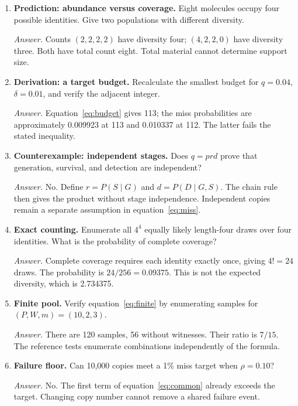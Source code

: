 \begin{enumerate}
\item \textbf{Prediction: abundance versus coverage.} Eight molecules occupy four possible identities. Give two populations with different diversity.\par
\textit{Answer.} Counts $(2,2,2,2)$ have diversity four; $(4,2,2,0)$ have diversity three. Both have total count eight. Total material cannot determine support size.

\item \textbf{Derivation: a target budget.} Recalculate the smallest budget for $q=0.04$, $\delta=0.01$, and verify the adjacent integer.\par
\textit{Answer.} Equation~\ref{eq:budget} gives 113; the miss probabilities are approximately 0.009923 at 113 and 0.010337 at 112. The latter fails the stated inequality.

\item \textbf{Counterexample: independent stages.} Does $q=prd$ prove that generation, survival, and detection are independent?\par
\textit{Answer.} No. Define $r=P(S\mid G)$ and $d=P(D\mid G,S)$. The chain rule then gives the product without stage independence. Independent copies remain a separate assumption in equation~\ref{eq:miss}.

\item \textbf{Exact counting.} Enumerate all $4^4$ equally likely length-four draws over four identities. What is the probability of complete coverage?\par
\textit{Answer.} Complete coverage requires each identity exactly once, giving $4!=24$ draws. The probability is $24/256=0.09375$. This is not the expected diversity, which is 2.734375.

\item \textbf{Finite pool.} Verify equation~\ref{eq:finite} by enumerating samples for $(P,W,m)=(10,2,3)$.\par
\textit{Answer.} There are 120 samples, 56 without witnesses. Their ratio is $7/15$. The reference tests enumerate combinations independently of the formula.

\item \textbf{Failure floor.} Can 10,000 copies meet a 1\% miss target when $\rho=0.10$?\par
\textit{Answer.} No. The first term of equation~\ref{eq:common} already exceeds the target. Changing copy number cannot remove a shared failure event.


\end{enumerate}
